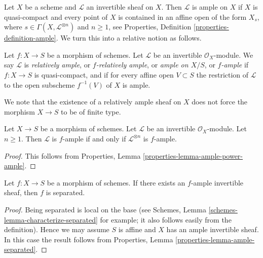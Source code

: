\noindent
Let $X$ be a scheme and $\mathcal{L}$ an invertible sheaf on $X$.
Then $\mathcal{L}$ is ample on $X$ if $X$ is quasi-compact and
every point of $X$ is contained in an affine open of the form
$X_s$, where $s \in \Gamma(X, \mathcal{L}^{\otimes n})$ and $n \geq 1$, see
Properties, Definition \ref{properties-definition-ample}.
We turn this into a relative notion as follows.

\begin{definition}
\label{definition-relatively-ample}
\begin{reference}
\cite[II Definition 4.6.1]{EGA}
\end{reference}
Let $f : X \to S$ be a morphism of schemes.
Let $\mathcal{L}$ be an invertible $\mathcal{O}_X$-module.
We say $\mathcal{L}$ is {\it relatively ample}, or {\it $f$-relatively ample},
or {\it ample on $X/S$}, or {\it $f$-ample} if $f : X \to S$
is quasi-compact, and if for every affine open $V \subset S$
the restriction of $\mathcal{L}$ to the open subscheme
$f^{-1}(V)$ of $X$ is ample.
\end{definition}

\noindent
We note that the existence of a relatively ample sheaf on $X$ does not
force the morphism $X \to S$ to be of finite type.

\begin{lemma}
\label{lemma-ample-power-ample}
Let $X \to S$ be a morphism of schemes.
Let $\mathcal{L}$ be an invertible $\mathcal{O}_X$-module.
Let $n \geq 1$. Then $\mathcal{L}$ is $f$-ample if and only if
$\mathcal{L}^{\otimes n}$ is $f$-ample.
\end{lemma}

\begin{proof}
This follows from Properties, Lemma \ref{properties-lemma-ample-power-ample}.
\end{proof}

\begin{lemma}
\label{lemma-relatively-ample-separated}
Let $f : X \to S$ be a morphism of schemes.
If there exists an $f$-ample invertible sheaf, then
$f$ is separated.
\end{lemma}

\begin{proof}
Being separated is local on the base (see
Schemes, Lemma \ref{schemes-lemma-characterize-separated} for example;
it also follows easily from the definition).
Hence we may assume $S$ is affine and $X$
has an ample invertible sheaf. In this case the
result follows from
Properties, Lemma \ref{properties-lemma-ample-separated}.
\end{proof}

